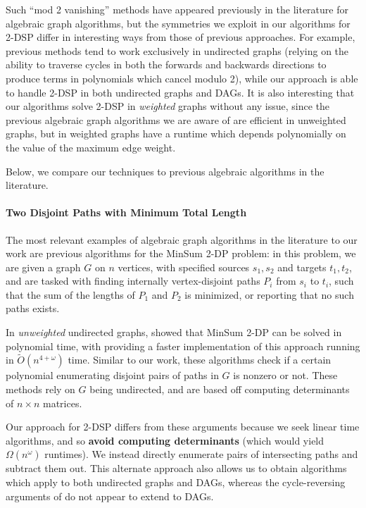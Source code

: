 \documentclass[11pt]{article}
\theoremstyle{definition}
\begin{document}
Such ``mod 2 vanishing'' methods have appeared previously in the literature for algebraic graph algorithms, but the symmetries we exploit in our algorithms for \textsf{2-DSP} differ in interesting ways from those of previous approaches. 
For example, previous methods tend to work exclusively in undirected graphs (relying on the ability to traverse cycles in both the forwards and backwards directions to produce terms in polynomials which cancel modulo 2), while our approach is able to handle \textsf{2-DSP} in both undirected graphs and DAGs.
It is also interesting that our algorithms solve \textsf{2-DSP} in \emph{weighted} graphs without any issue, since the previous algebraic graph algorithms we are aware of are efficient in unweighted graphs, but in weighted graphs have a runtime which depends polynomially on the value of the maximum edge weight.

Below, we compare our techniques to previous algebraic algorithms  in the literature.

\paragraph{Two Disjoint Paths with Minimum Total Length}

The most relevant examples of algebraic graph algorithms in the literature to our work are previous algorithms for the \textsf{MinSum 2-DP} problem:
in this problem, we are given a graph $G$ on $n$ vertices, with specified sources $s_1,s_2$ and targets $t_1,t_2$, and are tasked with finding internally vertex-disjoint paths $P_i$ from $s_i$ to $t_i$, such that the sum of the lengths of $P_1$ and $P_2$ is minimized, or reporting that no such paths exists.

In \emph{unweighted} undirected graphs, \cite{BjorklundHusfeldt-SDP}  showed that \textsf{MinSum 2-DP} can be solved in 
polynomial time, with 
\cite[Section 6]{BjorklundHusfeldtKaski2022} providing a faster implementation of this approach running in  $\tilde{O}(n^{4+\omega})$ time.
Similar to our work, these algorithms
 check if a certain polynomial enumerating disjoint pairs of paths in $G$ is nonzero or not.
These methods rely on $G$ being undirected, and are based off computing determinants of $n\times n$ matrices.

Our approach for \textsf{2-DSP} differs from these arguments because we seek linear time algorithms, and so \textbf{avoid computing determinants} (which would yield $\Omega(n^\omega)$ runtimes).
We instead directly enumerate pairs of intersecting paths and subtract them out.
This alternate approach also allows us to obtain algorithms which apply to both  undirected graphs and DAGs, whereas the cycle-reversing arguments of \cite{BjorklundHusfeldtKaski2022} do not appear to extend to DAGs.
\end{document}
